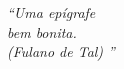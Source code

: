 \begin{epigrafe}
    \vspace*{\fill}
	\begin{flushright}
		\textit{``Uma epígrafe\\
		bem bonita.\\
		(Fulano de Tal)
		''}
	\end{flushright}
\end{epigrafe}
